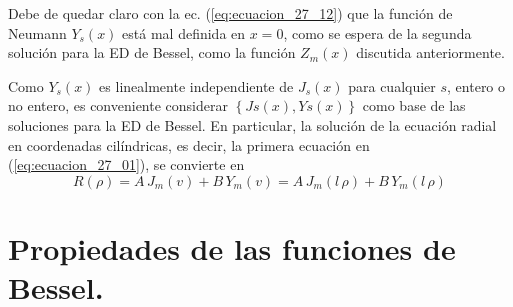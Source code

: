 Debe de quedar claro con la ec. (\ref{eq:ecuacion_27_12}) que la función de Neumann $Y_{s} (x)$ está mal definida en $x = 0$, como se espera de la segunda solución para la ED de Bessel, como la función $Z_{m} (x)$ discutida anteriormente.
\par
Como $Y_{s} (x)$ es linealmente independiente de $J_{s} (x)$ para cualquier $s$, entero o no entero, es conveniente considerar $\left\{ Js (x), Ys (x) \right\}$ como base de las soluciones para la ED de Bessel. En particular, la solución de la ecuación radial en coordenadas cilíndricas, es decir, la primera ecuación en (\ref{eq:ecuacion_27_01}), se convierte en
\begin{equation}
R(\rho) = A \, J_{m}(v) + B \, Y_{m}(v) = A \, J_{m} (l \, \rho) + B \, Y_{m} (l \, \rho)
\label{eq:ecuacion_27_13}
\end{equation}
\section{Propiedades de las funciones de Bessel.}
